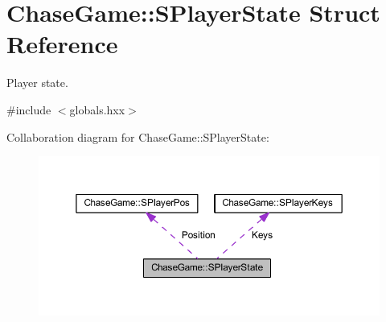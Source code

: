 \hypertarget{struct_chase_game_1_1_s_player_state}{\section{Chase\-Game\-:\-:S\-Player\-State Struct Reference}
\label{struct_chase_game_1_1_s_player_state}
}


Player state.  




{\ttfamily \#include $<$globals.\-hxx$>$}



Collaboration diagram for Chase\-Game\-:\-:S\-Player\-State\-:
\nopagebreak
\begin{figure}[H]
\begin{center}
\leavevmode
\includegraphics[width=350pt]{struct_chase_game_1_1_s_player_state__coll__graph}
\end{center}
\end{figure}
